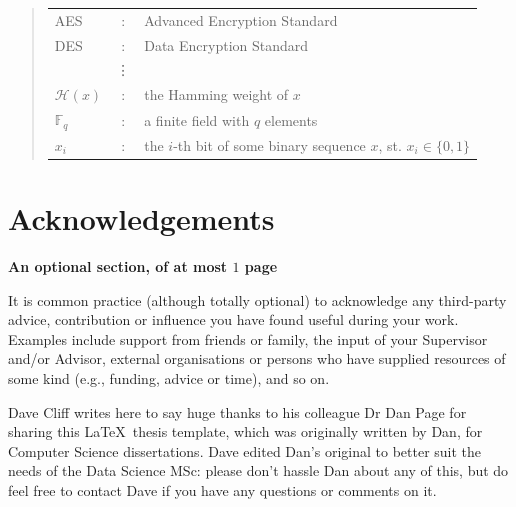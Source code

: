 \documentclass[ %
                    author={Ashrey Ashrey, Sanya Kapoor, Trisha Sharma, Yash Bhooshan Pandloskar},
                supervisor={Dr. Dalila O’Grady},
                    degree={MSc},
                     title={Using machine learning to forecast physical activity participation, volunteering and activity patterns in London},
                  subtitle={},
                      type={},
                      year={2021}]{dissertation}
\begin{document}
\begin{quote}
\noindent
\begin{tabular}{lcl}
AES                 &:     & Advanced Encryption Standard                                         \\
DES                 &:     & Data Encryption Standard                                             \\
                    &\vdots&                                                                      \\
${\mathcal H}( x )$ &:     & the Hamming weight of $x$                                            \\
${\mathbb  F}_q$    &:     & a finite field with $q$ elements                                     \\
$x_i$               &:     & the $i$-th bit of some binary sequence $x$, st. $x_i \in \{ 0, 1 \}$ \\
\end{tabular}
\end{quote}


\chapter*{Acknowledgements}

{\bf An optional section, of at most $1$ page}
\vspace{1cm} 

\noindent
It is common practice (although totally optional) to acknowledge any
third-party advice, contribution or influence you have found useful
during your work.  Examples include support from friends or family, 
the input of your Supervisor and/or Advisor, external organisations 
or persons who  have supplied resources of some kind (e.g., funding, 
advice or time), and so on.

\vspace{1cm}
Dave Cliff writes here to say huge thanks to his colleague Dr Dan Page for sharing this \LaTeX\ thesis template, which was originally written by Dan, for Computer Science dissertations. Dave edited Dan's original to better suit the needs of the Data Science MSc: please don't hassle Dan about any of this, but do feel free to contact Dave if you have any questions or comments on it.  

\end{document}
